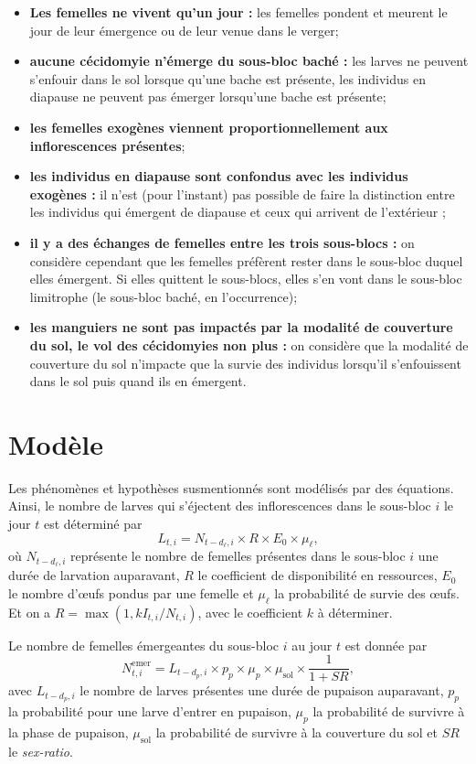 \documentclass[a4paper, 11pt]{article}
\begin{document}
\begin{itemize}
 \item \textbf{Les femelles ne vivent qu'un jour :} les femelles pondent et meurent le jour de leur émergence ou de leur venue dans le verger;
 \item \textbf{aucune cécidomyie n'émerge du sous-bloc baché :} les larves ne peuvent s'enfouir dans le sol lorsque qu'une bache est présente, les individus en diapause ne peuvent pas émerger lorsqu'une bache est présente;
 \item \textbf{les femelles exogènes viennent proportionnellement aux inflorescences présentes};
 \item \textbf{les individus en diapause sont confondus avec les individus exogènes :} il n'est (pour l'instant) pas possible de faire la distinction entre les individus qui émergent de diapause et ceux qui arrivent de l'extérieur ;
 \item \textbf{il y a des échanges de femelles entre les trois sous-blocs :} on considère cependant que les femelles préfèrent rester dans le sous-bloc duquel elles émergent. Si elles quittent le sous-blocs, elles s'en vont dans le sous-bloc limitrophe (le sous-bloc baché, en l'occurrence);
 \item \textbf{les manguiers ne sont pas impactés par la modalité de couverture du sol, le vol des cécidomyies non plus :} on considère que la modalité de couverture du sol n'impacte que la survie des individus lorsqu'il s'enfouissent dans le sol puis quand ils en émergent.
\end{itemize}


\section{Modèle}

Les phénomènes et hypothèses susmentionnés sont modélisés par des équations. Ainsi, le nombre de larves qui s'éjectent des inflorescences dans le sous-bloc $i$ le jour $t$ est déterminé par
$$L_{t, i} = N_{t-d_\ell, i} \times R \times E_0 \times \mu_\ell,$$
où $N_{t-d_\ell, i}$ représente le nombre de femelles présentes dans le sous-bloc $i$ une durée de larvation auparavant, $R$ le coefficient de disponibilité en ressources, $E_0$ le nombre d'œufs pondus par une femelle et $\mu_\ell$ la probabilité de survie des œufs. Et on a $R = \max\left( 1, k I_{t, i} / N_{t, i} \right)$, avec le coefficient $k$ à déterminer.

Le nombre de femelles émergeantes du sous-bloc $i$ au jour $t$ est donnée par
$$N^{\text{emer}}_{t, i} = L_{t - d_p, i} \times p_p \times \mu_p \times \mu_{\text{sol}} \times \frac{1}{1+SR},$$
avec $L_{t - d_p, i}$ le nombre de larves présentes une durée de pupaison auparavant, $p_p$ la probabilité pour une larve d'entrer en pupaison, $\mu_p$ la probabilité de survivre à la phase de pupaison, $\mu_{\text{sol}}$ la probabilité de survivre à la couverture du sol et $SR$ le \textit{sex-ratio}.
\end{document}
